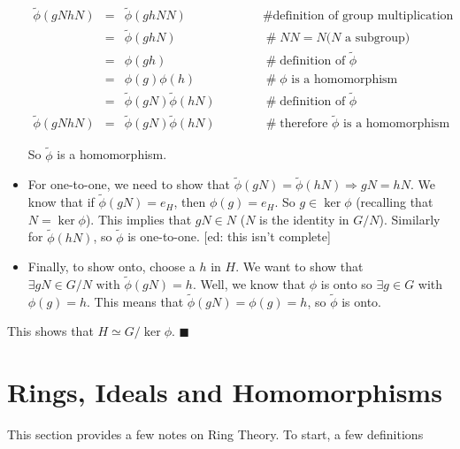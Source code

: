 \documentclass{article}
\theoremstyle{definition}
\begin{document}
\begin{itemize}
\begin{equation*}
\begin{array}{rcll}
\widetilde{\phi}(gN hN)
&=& \widetilde{\phi}(ghNN)
                &\hspace{3em} \mathrel{\#} \text{definition of group multiplication} \\
[3pt]
&=& \widetilde{\phi}(ghN)
                &\hspace{3em} \mathrel{\#} NN = N \text{($N$ a subgroup)} \\
[3pt]
&=& \phi(gh)
                &\hspace{3em} \mathrel{\#} \text{definition of $\widetilde{\phi}$} \\
[3pt]
&=& \phi(g)\phi(h)
                &\hspace{3em} \mathrel{\#} \phi \text{ is a homomorphism} \\
[3pt]
&=& \widetilde{\phi}(gN) \widetilde{\phi}(hN)
                &\hspace{3em} \mathrel{\#} \text{definition of $\widetilde{\phi}$} \\
[3pt]
\widetilde{\phi}(gN hN) &=& \widetilde{\phi}(gN)
\widetilde{\phi}(hN)
                &\hspace{3em} \mathrel{\#} \text{therefore $\widetilde{\phi}$ is a homomorphism}
\end{array}
\end{equation*}

\medskip
\noindent
So $\widetilde{\phi}$ is a homomorphism.

\item For one-to-one, we need to show that $\widetilde{\phi}(gN)
= \widetilde{\phi}(hN) \Rightarrow gN = hN$. We know that if
$\widetilde{\phi}(gN) = e_H$, then $\phi(g) = e_H$. So $g \in
\ker \phi$ (recalling that $N = \ker \phi$). This implies that
$gN \in N$ ($N$ is the identity in $G/N$). Similarly for
$\widetilde{\phi}(hN)$, so $\widetilde{\phi}$ is one-to-one. [ed:
this isn't complete]

\item Finally, to show onto, choose a $h$ in $H$. We want to show
that $\exists gN \in G/N \text{ with } \widetilde{\phi}(gN) =
h$. Well, we know that $\phi$ is onto so $\exists g \in G$ with
$\phi(g) = h$. This means that $\widetilde{\phi}(gN) = \phi(g) =
h$, so $\widetilde{\phi}$ is onto.
\end{itemize}


\smallskip
\noindent
This shows that $H \simeq G/\ker \phi$. $\blacksquare$

\section{Rings, Ideals and Homomorphisms}
This section provides a few notes on Ring Theory. To start, a few
definitions 
\end{document}
